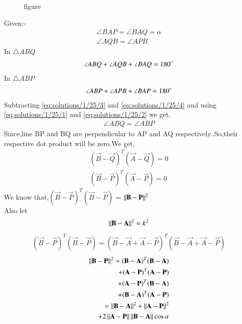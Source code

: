 \begin{figure}[!ht]
\centering
\resizebox{\columnwidth}{!}{}
\caption{figure}
\label{eq:solutions/1/25/fig1}
\end{figure}

Given:-
\begin{align}
  \angle{BAP}=\angle{BAQ}=\alpha\label{eq:solutions/1/25/1}\\ 
    \angle{AQB}=\angle{APB}\label{eq:solutions/1/25/2}
\end{align}
In $\triangle ABQ$
\begin{align}
    \angle{ABQ} + \angle{AQB} + \angle{BAQ}=180\degree\label{eq:solutions/1/25/3}
\end{align}
In $\triangle ABP$
\begin{align}
    \angle{ABP} + \angle{APB} + \angle{BAP}=180\degree\label{eq:solutions/1/25/4}
\end{align}
Subtracting \eqref{eq:solutions/1/25/3} and \eqref{eq:solutions/1/25/4} and using \eqref{eq:solutions/1/25/1} and \eqref{eq:solutions/1/25/2} we get,
\begin{align}
\angle{ABQ}=\angle{ABP}
\end{align}
Since,line BP and BQ are perpendicular to AP and AQ respectively..So,their respective dot product will be zero.We get,
\begin{align}
    (\vec{B}-\vec{Q})^T(\vec{A}-\vec{Q})=0\label{eq:solutions/1/25/5}\\
    (\vec{B}-\vec{P})^T(\vec{A}-\vec{P})=0\label{eq:solutions/1/25/6}
\end{align}
We know that,$(\vec{B}-\vec{P})^T(\vec{B}-\vec{P})$ = $\left\lVert\mathbf{B}-\mathbf{P}\right\rVert^2$\\
 Also let
 \begin{align}
 \left\lVert\mathbf{B}-\mathbf{A}\right\rVert^2 = k^2\label{eq:solutions/1/25/7}
 \end{align}
\begin{align}
(\vec{B}-\vec{P})^T(\vec{B}-\vec{P})=(\vec{B}-\vec{A}+\vec{A}-\vec{P})^T(\vec{B}-\vec{A}+\vec{A}-\vec{P})
\end{align}
\begin{align}
 \begin{split}
\left\lVert\mathbf{B}-\mathbf{P}\right\rVert^2=(\mathbf{B}-\mathbf{A})^T(\mathbf{B}-\mathbf{A})\\
+(\mathbf{A}-\mathbf{P})^T(\mathbf{A}-\mathbf{P})\\
+(\mathbf{A}-\mathbf{P})^T(\mathbf{B}-\mathbf{A})\\
+(\mathbf{B}-\mathbf{A})^T(\mathbf{A}-\mathbf{P})\\
=\left\lVert\mathbf{B}-\mathbf{A}\right\rVert^2 + \left\lVert\mathbf{A}-\mathbf{P}\right\rVert^2\\ 
  + 2\left\lVert\mathbf{A}-\mathbf{P}\right\rVert\left\lVert\mathbf{B}-\mathbf{A}\right\rVert\cos\alpha\label{eq:solutions/1/25/8}
  \end{split}
\end{align}
